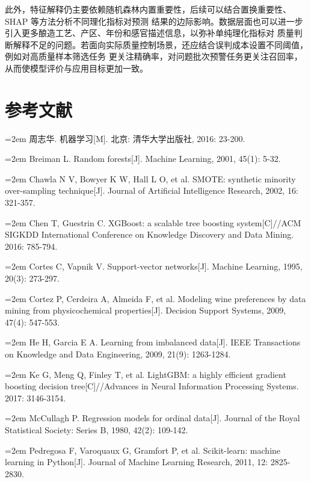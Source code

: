 \documentclass[12pt,a4paper,fontset=fandol]{ctexart}
\numberwithin{figure}{section}
\numberwithin{table}{section}
\numberwithin{equation}{section}
\begin{document}
此外，特征解释仍主要依赖随机森林内置重要性，后续可以结合置换重要性、SHAP 等方法分析不同理化指标对预测
结果的边际影响。数据层面也可以进一步引入更多酿造工艺、产区、年份和感官描述信息，以弥补单纯理化指标对
质量判断解释不足的问题。若面向实际质量控制场景，还应结合误判成本设置不同阈值，例如对高质量样本筛选任务
更关注精确率，对问题批次预警任务更关注召回率，从而使模型评价与应用目标更加一致。

\section*{参考文献}
{\setlength{\parindent}{0pt}
\newcommand{\refentry}[1]{\par\hangindent=2em #1\vspace{3pt}}
\refentry{周志华. 机器学习[M]. 北京: 清华大学出版社, 2016: 23-200.}
\refentry{Breiman L. Random forests[J]. Machine Learning, 2001, 45(1): 5-32.}
\refentry{Chawla N V, Bowyer K W, Hall L O, et al. SMOTE: synthetic minority over-sampling technique[J]. Journal of Artificial Intelligence Research, 2002, 16: 321-357.}
\refentry{Chen T, Guestrin C. XGBoost: a scalable tree boosting system[C]//ACM SIGKDD International Conference on Knowledge Discovery and Data Mining. 2016: 785-794.}
\refentry{Cortes C, Vapnik V. Support-vector networks[J]. Machine Learning, 1995, 20(3): 273-297.}
\refentry{Cortez P, Cerdeira A, Almeida F, et al. Modeling wine preferences by data mining from physicochemical properties[J]. Decision Support Systems, 2009, 47(4): 547-553.}
\refentry{He H, Garcia E A. Learning from imbalanced data[J]. IEEE Transactions on Knowledge and Data Engineering, 2009, 21(9): 1263-1284.}
\refentry{Ke G, Meng Q, Finley T, et al. LightGBM: a highly efficient gradient boosting decision tree[C]//Advances in Neural Information Processing Systems. 2017: 3146-3154.}
\refentry{McCullagh P. Regression models for ordinal data[J]. Journal of the Royal Statistical Society: Series B, 1980, 42(2): 109-142.}
\refentry{Pedregosa F, Varoquaux G, Gramfort P, et al. Scikit-learn: machine learning in Python[J]. Journal of Machine Learning Research, 2011, 12: 2825-2830.}
}
\end{document}
